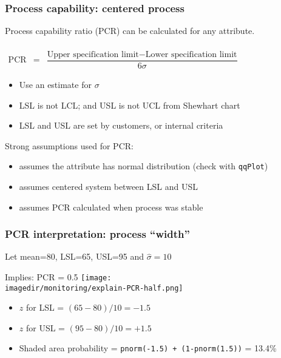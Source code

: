 \begin{frame}\frametitle{Process capability: centered process}

	Process capability ratio (PCR) can be calculated for any attribute.

	$
	\begin{array}{rcl}
		\\
		\text{PCR} &=& \dfrac{\text{Upper specification limit} - \text{Lower specification limit}}{6\sigma}
	\end{array}
	$
	\begin{itemize}
		\item	Use an estimate for $\sigma$
		\item	LSL is not LCL; and USL is not UCL from Shewhart chart
		\item	LSL and USL are set by customers, or internal criteria
	\end{itemize}

	Strong assumptions used for PCR:
	\begin{itemize}
		\item	assumes the attribute has normal distribution (check with \texttt{qqPlot})
		\item	assumes centered system between LSL and USL
		\item	assumes PCR calculated when process was stable
	\end{itemize}
\end{frame}

\begin{frame}\frametitle{PCR interpretation: process ``width''}

	Let mean=80, LSL=65, USL=95 and $\hat{\sigma} = 10$

	Implies: PCR = 0.5
	\texttt{[image: \\imagedir/monitoring/explain-PCR-half.png]}
	\begin{itemize}
		\item	$z$ for LSL = $(65 - 80)/10 = -1.5$
		\item	$z$ for USL = $(95 - 80)/10 = +1.5$
		\item	Shaded area probability = \texttt{pnorm(-1.5) + (1-pnorm(1.5))} = 13.4\%
	\end{itemize}
\end{frame}


